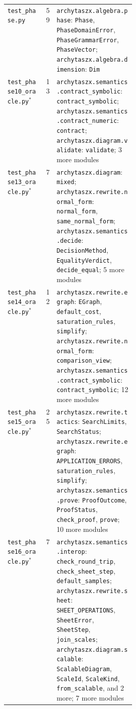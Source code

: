 \begin{xltabular}{\linewidth}{@{}>{\raggedright\arraybackslash}p{0.3\linewidth}r>{\raggedright\arraybackslash}X@{}}
\texttt{test\_\allowbreak{}phase.py} & 59 & \texttt{archytaszx.\allowbreak{}algebra.\allowbreak{}phase}: \texttt{Phase}, \texttt{PhaseDomainError}, \texttt{PhaseGrammarError}, \texttt{PhaseVector}; \texttt{archytaszx.\allowbreak{}algebra.\allowbreak{}dimension}: \texttt{Dim} \\
\texttt{test\_\allowbreak{}phase10\_\allowbreak{}oracle.py}$^{\ast}$ & 13 & \texttt{archytaszx.\allowbreak{}semantics.\allowbreak{}contract\_\allowbreak{}symbolic}: \texttt{contract\_\allowbreak{}symbolic}; \texttt{archytaszx.\allowbreak{}semantics.\allowbreak{}contract\_\allowbreak{}numeric}: \texttt{contract}; \texttt{archytaszx.\allowbreak{}diagram.\allowbreak{}validate}: \texttt{validate}; 3 more modules \\
\texttt{test\_\allowbreak{}phase13\_\allowbreak{}oracle.py}$^{\ast}$ & 7 & \texttt{archytaszx.\allowbreak{}diagram}: \texttt{mixed}; \texttt{archytaszx.\allowbreak{}rewrite.\allowbreak{}normal\_\allowbreak{}form}: \texttt{normal\_\allowbreak{}form}, \texttt{same\_\allowbreak{}normal\_\allowbreak{}form}; \texttt{archytaszx.\allowbreak{}semantics.\allowbreak{}decide}: \texttt{DecisionMethod}, \texttt{EqualityVerdict}, \texttt{decide\_\allowbreak{}equal}; 5 more modules \\
\texttt{test\_\allowbreak{}phase14\_\allowbreak{}oracle.py}$^{\ast}$ & 12 & \texttt{archytaszx.\allowbreak{}rewrite.\allowbreak{}egraph}: \texttt{EGraph}, \texttt{default\_\allowbreak{}cost}, \texttt{saturation\_\allowbreak{}rules}, \texttt{simplify}; \texttt{archytaszx.\allowbreak{}rewrite.\allowbreak{}normal\_\allowbreak{}form}: \texttt{comparison\_\allowbreak{}view}; \texttt{archytaszx.\allowbreak{}semantics.\allowbreak{}contract\_\allowbreak{}symbolic}: \texttt{contract\_\allowbreak{}symbolic}; 12 more modules \\
\texttt{test\_\allowbreak{}phase15\_\allowbreak{}oracle.py}$^{\ast}$ & 25 & \texttt{archytaszx.\allowbreak{}rewrite.\allowbreak{}tactics}: \texttt{SearchLimits}, \texttt{SearchStatus}; \texttt{archytaszx.\allowbreak{}rewrite.\allowbreak{}egraph}: \texttt{APPLICATION\_\allowbreak{}ERRORS}, \texttt{saturation\_\allowbreak{}rules}, \texttt{simplify}; \texttt{archytaszx.\allowbreak{}semantics.\allowbreak{}prove}: \texttt{ProofOutcome}, \texttt{ProofStatus}, \texttt{check\_\allowbreak{}proof}, \texttt{prove}; 10 more modules \\
\texttt{test\_\allowbreak{}phase16\_\allowbreak{}oracle.py}$^{\ast}$ & 7 & \texttt{archytaszx.\allowbreak{}semantics.\allowbreak{}interop}: \texttt{check\_\allowbreak{}round\_\allowbreak{}trip}, \texttt{check\_\allowbreak{}sheet\_\allowbreak{}step}, \texttt{default\_\allowbreak{}samples}; \texttt{archytaszx.\allowbreak{}rewrite.\allowbreak{}sheet}: \texttt{SHEET\_\allowbreak{}OPERATIONS}, \texttt{SheetError}, \texttt{SheetStep}, \texttt{join\_\allowbreak{}scales}; \texttt{archytaszx.\allowbreak{}diagram.\allowbreak{}scalable}: \texttt{ScalableDiagram}, \texttt{ScaleId}, \texttt{ScaleKind}, \texttt{from\_\allowbreak{}scalable}, and 2 more; 7 more modules \\

\end{xltabular}
